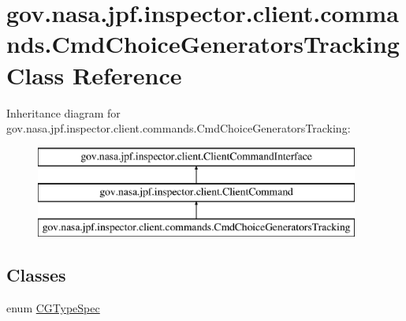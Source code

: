 \hypertarget{classgov_1_1nasa_1_1jpf_1_1inspector_1_1client_1_1commands_1_1_cmd_choice_generators_tracking}{}\section{gov.\+nasa.\+jpf.\+inspector.\+client.\+commands.\+Cmd\+Choice\+Generators\+Tracking Class Reference}
\label{classgov_1_1nasa_1_1jpf_1_1inspector_1_1client_1_1commands_1_1_cmd_choice_generators_tracking}
Inheritance diagram for gov.\+nasa.\+jpf.\+inspector.\+client.\+commands.\+Cmd\+Choice\+Generators\+Tracking\+:\begin{figure}[H]
\begin{center}
\leavevmode
\includegraphics[height=3.000000cm]{classgov_1_1nasa_1_1jpf_1_1inspector_1_1client_1_1commands_1_1_cmd_choice_generators_tracking}
\end{center}
\end{figure}
\subsection*{Classes}
\begin{DoxyCompactItemize}
\item 
enum \hyperlink{enumgov_1_1nasa_1_1jpf_1_1inspector_1_1client_1_1commands_1_1_cmd_choice_generators_tracking_1_1_c_g_type_spec}{C\+G\+Type\+Spec}
\end{DoxyCompactItemize}

